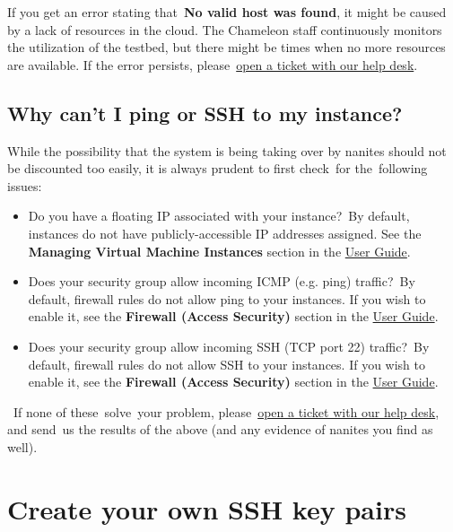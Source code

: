 If you get an error stating that~\textbf{No valid host was found}, it
might be caused by a lack of resources in the cloud. The Chameleon staff
continuously monitors the utilization of the testbed, but there might be
times when no more resources are available. If the error persists,
please~\href{https://www.chameleoncloud.org/user/help/}{open a ticket
with our help desk}.

\subsection{Why can't I ping or SSH to my
instance?}\label{why-cant-i-ping-or-ssh-to-my-instance}

While the possibility that the system is being taking over by nanites
should not be discounted too easily, it is always prudent to first
check~for the~following issues:

\begin{itemize}

\item
  Do you have a floating IP associated with your instance?~By default,
  instances do not have publicly-accessible IP addresses assigned. See
  the \textbf{Managing Virtual Machine Instances} section in the
  \href{https://www.chameleoncloud.org/docs/user-guides/openstack-kvm-user-guide/}{User
  Guide}.
\item
  Does your security group allow incoming ICMP (e.g. ping) traffic?~By
  default, firewall rules do not allow ping to your instances. If you
  wish to enable it, see the \textbf{Firewall (Access Security)} section
  in the
  \href{https://www.chameleoncloud.org/docs/user-guides/openstack-kvm-user-guide/}{User
  Guide}.
\item
  Does your security group allow incoming SSH (TCP port 22) traffic?~By
  default, firewall rules do not allow SSH to your instances. If you
  wish to enable it, see the \textbf{Firewall (Access Security)} section
  in the
  \href{https://www.chameleoncloud.org/docs/user-guides/openstack-kvm-user-guide/}{User
  Guide}.
\end{itemize}

~If none of these~solve~your problem,
please~\href{https://www.chameleoncloud.org/user/help/}{open a ticket
with our help desk}, and send~us the results of the above (and any
evidence of nanites you find as well).

\section{Create your own SSH key
pairs}\label{create-your-own-ssh-key-pairs}

